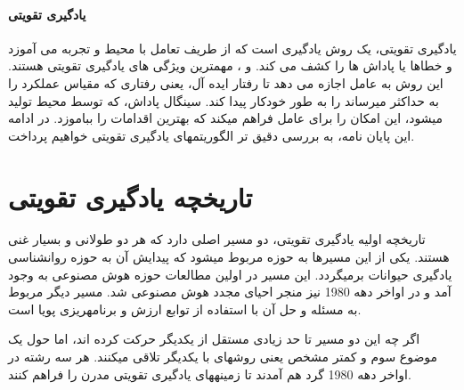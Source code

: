 \paragraph{یادگیری تقویتی}
یادگیری تقویتی، یک روش یادگیری است که از طریف تعامل با محیط و تجربه می \nf آموزد و خطاها یا پاداش ها را کشف می کند.  و ، مهمترین ویژگی  های یادگیری تقویتی هستند. این روش به عامل اجازه می دهد تا رفتار ایده آل، یعنی رفتاری که مقیاس عملکرد را به حداکثر می\nf رساند را به طور خودکار پیدا کند. سینگال پاداش،  که توسط محیط تولید می\nf شود، این امکان را برای عامل فراهم می\nf کند که بهترین اقدامات را بباموزد. در ادامه این پایان نامه، به بررسی دقیق تر الگوریتم\nf های یادگیری تقویتی خواهیم پرداخت.


\section{تاریخچه یادگیری تقویتی}
تاریخچه اولیه یادگیری تقویتی، دو مسیر اصلی دارد که هر دو طولانی و بسیار غنی هستند. یکی از این مسیرها به حوزه  مربوط می\nf شود که پیدایش آن به حوزه روانشناسی یادگیری حیوانات برمی\nf گردد. این مسیر در اولین مطالعات حوزه هوش مصنوعی به وجود آمد و در اواخر دهه 1980 نیز منجر احیای مجدد هوش مصنوعی شد. مسیر دیگر مربوط به مسئله  و حل آن با استفاده از توابع ارزش و برنامه\nf ریزی پویا است.

 اگر چه این دو مسیر تا حد زیادی مستقل از یکدیگر حرکت کرده اند،  اما حول یک موضوع سوم و کمتر مشخص یعنی روش\nf های   با یکدیگر تلاقی می\nf کنند. هر سه رشته در اواخر دهه 1980 گرد هم آمدند تا زمینه\nf های یادگیری تقویتی مدرن را فراهم کنند.



